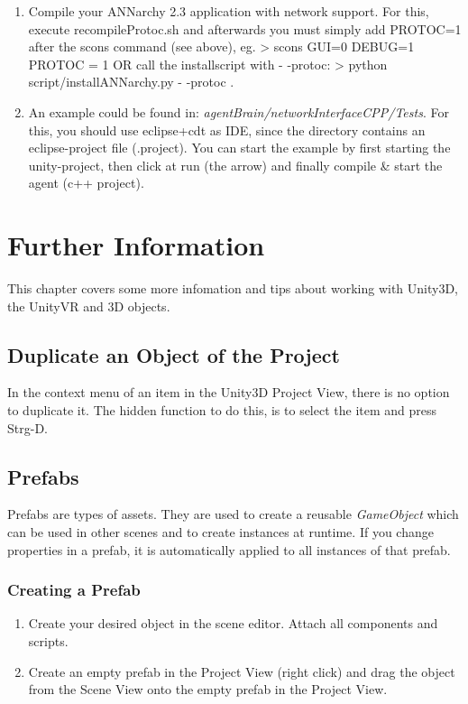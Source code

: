 \documentclass[10pt,final]{scrreprt}
\begin{document}
\begin{enumerate}
\begin{enumerate}
\item Compile your ANNarchy 2.3 application with network support. For this, execute \textsf{recompileProtoc.sh} and afterwards you must simply add PROTOC=1 after the scons command (see above), eg. \textsf{> scons  GUI=0 DEBUG=1 PROTOC = 1}  OR call the installscript with - -protoc: \textsf{> python script/installANNarchy.py - -protoc} .
\item An example could be found in: \emph{agentBrain/networkInterfaceCPP/Tests}. For this, you should use eclipse+cdt as IDE, since the directory contains an eclipse-project file (.project). You can start the example by first starting the unity-project, then click at run (the arrow) and finally compile \& start the agent (c++ project).
\end{enumerate}
\end{enumerate}


\chapter{Further Information}

This chapter covers some more infomation and tips about working with Unity3D, the UnityVR and 3D objects.

\section{Duplicate an Object of the Project}

In the  context menu of an item in the Unity3D Project View, there is no option to duplicate it. The hidden function to do this, is to select the item and press Strg-D.


\section{Prefabs}
\label{prefabs}

Prefabs are types of assets. They are used to create a reusable \emph{GameObject} which can be used in other scenes and to create instances at runtime. If you change properties in a prefab, it is automatically applied to all instances of that prefab.

\subsection{Creating a Prefab}

\begin{enumerate}
\item Create your desired object in the scene editor. Attach all components and scripts.
\item Create an empty prefab in the Project View (right click) and drag the object from the Scene View onto the empty prefab in the Project View.
\end{enumerate}
\end{document}
